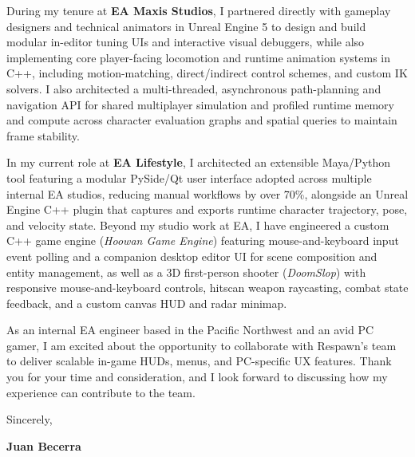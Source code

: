 \documentclass[letterpaper,11pt]{article}
\begin{document}
During my tenure at \textbf{EA Maxis Studios}, I partnered directly with gameplay designers and 
technical animators in Unreal Engine 5 to design and build modular in-editor tuning UIs and 
interactive visual debuggers, while also implementing core player-facing locomotion and runtime 
animation systems in C++, including motion-matching, direct/indirect control schemes, and custom 
IK solvers. I also architected a multi-threaded, asynchronous path-planning and navigation API 
for shared multiplayer simulation and profiled runtime memory and compute across character 
evaluation graphs and spatial queries to maintain frame stability.

In my current role at \textbf{EA Lifestyle}, I architected an extensible Maya/Python tool 
featuring a modular PySide/Qt user interface adopted across multiple internal EA studios, reducing 
manual workflows by over 70\%, alongside an Unreal Engine C++ plugin that captures and exports 
runtime character trajectory, pose, and velocity state. Beyond my studio work at EA, I have 
engineered a custom C++ game engine (\emph{Hoowan Game Engine}) featuring mouse-and-keyboard input 
event polling and a companion desktop editor UI for scene composition and entity management, as 
well as a 3D first-person shooter (\emph{DoomSlop}) with responsive mouse-and-keyboard controls, 
hitscan weapon raycasting, combat state feedback, and a custom canvas HUD and radar minimap.

As an internal EA engineer based in the Pacific Northwest and an avid PC gamer, I am excited about 
the opportunity to collaborate with Respawn's team to deliver scalable in-game HUDs, menus, and 
PC-specific UX features. Thank you for your time and consideration, and I look forward to 
discussing how my experience can contribute to the team.

\vspace{10pt}
\noindent Sincerely,

\vspace{14pt}
\noindent \textbf{Juan Becerra}
\end{document}
